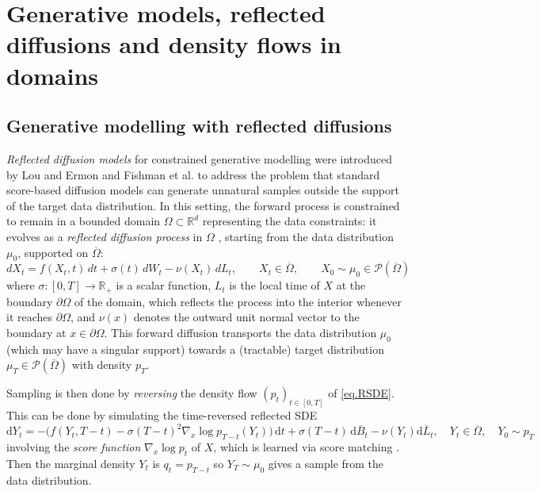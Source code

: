 \documentclass[11pt]{amsart}
\theoremstyle{definition}
\begin{document}
\newpage
\tableofcontents
\newpage
\section{Generative models, reflected diffusions and density flows in domains}\label{sec:intro}

\subsection{Generative modelling with reflected diffusions}\label{sec:generative}

{\it Reflected diffusion models} for constrained generative modelling were introduced  by Lou and Ermon \cite{LouErmon} and Fishman et al. \cite{fishman2024} to address the problem that standard
score-based diffusion models \cite{Song2021} can generate unnatural samples outside the support of the target data distribution. In this setting, the forward process is constrained to remain in a bounded domain $\Omega\subset \mathbb{R}^d$ representing the data constraints: it evolves as a {\it reflected diffusion process} in  $\Omega$ , starting from the data distribution $\mu_0$, supported on $\overline{\Omega}$:
\begin{equation}
dX_t =
f(X_t,t)\,dt + \sigma(t)\,dW_t - \nu(X_t)\,dL_t,
\qquad X_t\in\overline{\Omega},\qquad X_0\sim \mu_0\in {\mathcal P}(\overline{\Omega})\label{eq.RSDE}    
\end{equation}
where $\sigma:[0,T]\to\mathbb{R}_+ $ is a scalar function, $L_t$ is the  local time of $X$ at the boundary $\partial\Omega$ of the domain, which reflects the process into the interior whenever it reaches $\partial\Omega$, and $\nu(x)$ denotes the outward unit normal vector to the boundary at $x\in \partial\Omega$. This forward diffusion transports the data distribution $\mu_0$ (which may have a singular support) towards a (tractable) target distribution $\mu_T\in {\mathcal P}(\overline{\Omega})$ with density $p_T$.

Sampling is then done by {\it reversing} the density flow $(p_t)_{t\in[0,T]}$ of \eqref{eq.RSDE}. This can be done by simulating the time-reversed  reflected SDE \cite{Cattiaux88,petit1997}
\begin{equation}
\mathrm{d}Y_t = -\big(f(Y_t,T-t) - \sigma(T-t)^2 \nabla_x \log p_{T-t}(Y_t)\big)\,\mathrm{d}t + \sigma(T-t)\,\mathrm{d}\overline{B}_t -\nu(Y_t)\mathrm{d}\overline{L}_t,\quad
Y_t\in\overline{\Omega},\quad Y_0\sim p_T
\nonumber
\end{equation}
involving the {\it score function} $\nabla_x \log p_t$ of $X$, which is learned via   score matching \cite{LouErmon,fishman2024,Song2021,Song2021mle}. Then the marginal density   $Y_t$ is $q_t=p_{T-t}$ so $Y_T\sim \mu_0$ gives a sample from the data distribution.
\end{document}
